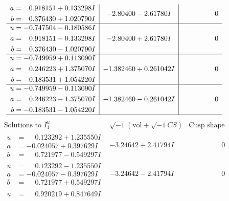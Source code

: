\documentclass[1p]{elsarticle_modified}
\theoremstyle{definition}
\newcommand{\I}{\sqrt{-1}}
\begin{document}
$$\begin{array}{c|c|c}
\begin{aligned}
a &= \phantom{-}0.918151 + 0.133298 I \\
b &= \phantom{-}0.376430 + 1.020790 I\end{aligned}
 & -2.80400 - 2.61780 I & \phantom{-0.000000 } 0 \\ \hline\begin{aligned}
u &= -0.747504 - 0.180586 I \\
a &= \phantom{-}0.918151 - 0.133298 I \\
b &= \phantom{-}0.376430 - 1.020790 I\end{aligned}
 & -2.80400 + 2.61780 I & \phantom{-0.000000 } 0 \\ \hline\begin{aligned}
u &= -0.749959 + 0.113090 I \\
a &= \phantom{-}0.246223 + 1.375070 I \\
b &= -0.183531 + 1.054220 I\end{aligned}
 & -1.382460 + 0.261042 I & \phantom{-0.000000 } 0 \\ \hline\begin{aligned}
u &= -0.749959 - 0.113090 I \\
a &= \phantom{-}0.246223 - 1.375070 I \\
b &= -0.183531 - 1.054220 I\end{aligned}
 & -1.382460 - 0.261042 I & \phantom{-0.000000 } 0\\
 \hline 
 \end{array}$$\newpage$$\begin{array}{c|c|c}  
\text{Solutions to }I^u_{1}& \I (\text{vol} + \sqrt{-1}CS) & \text{Cusp shape}\\
 \hline 
\begin{aligned}
u &= \phantom{-}0.123292 + 1.235550 I \\
a &= -0.024057 + 0.397629 I \\
b &= \phantom{-}0.721977 - 0.549297 I\end{aligned}
 & -3.24642 + 2.41794 I & \phantom{-0.000000 } 0 \\ \hline\begin{aligned}
u &= \phantom{-}0.123292 - 1.235550 I \\
a &= -0.024057 - 0.397629 I \\
b &= \phantom{-}0.721977 + 0.549297 I\end{aligned}
 & -3.24642 - 2.41794 I & \phantom{-0.000000 } 0 \\ \hline\begin{aligned}
u &= \phantom{-}0.920219 + 0.847649 I \\

\end{aligned}
\end{array}$$
\end{document}
